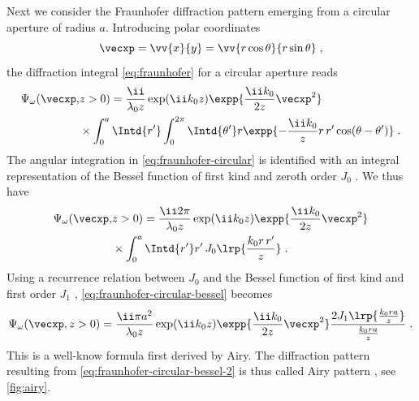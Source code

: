 \documentclass[
twoside,
openright,
titlepage,
numbers=noenddot,
headinclude,
fleqn,
a4paper,
footinclude=true,
cleardoublepage=empty,
abstractoff,
BCOR=5mm,
paper=a4,
fontsize=11pt,
british,ngerman,american,
]{scrreprt}
\begin{document}
Next we consider the Fraunhofer diffraction pattern emerging from a
circular aperture of radius $a$.  Introducing polar coordinates
\begin{equation}
  \label{eq:polar-2}
  \vecxp = \vv{x}{y} = 
  \vv{r \cos\theta}{r \sin\theta} \;,
\end{equation}
the diffraction integral \cref{eq:fraunhofer} for a circular aperture
reads
\begin{equation}
  \label{eq:fraunhofer-circular}
  \begin{split}
  \Psi_\omega(\vecxp,&z>0) =
   \frac{\ii }{\lambda_0 z}\exp(\ii k_0 z)
  \expp{\frac{\ii k_0}{2 z} \vecxp^2}
  \\ &\times\int_0^a\Intd{r'}\int_0^{2\pi}\Intd{\theta'} r 
  \expp{-\frac{\ii k_0}{z}r\,r' \cos(\theta-\theta')} \;.    
  \end{split}
\end{equation}
The angular integration in \cref{eq:fraunhofer-circular} is identified
with an integral representation of the Bessel function of first kind
and zeroth order $J_0$ \cite{BornWolf}.  We thus have
\begin{equation}
  \label{eq:fraunhofer-circular-bessel}
  \begin{split}
    \Psi_\omega(\vecxp,&z>0) =
    \frac{\ii 2 \pi}{\lambda_0 z}\exp(\ii k_0 z)
    \expp{\frac{\ii k_0}{2 z} \vecxp^2}
    \\ & \times\int_0^a\Intd{r'} r'\, J_0\lrp{\frac{k_0 r\,r'}{z}} \;.
  \end{split}
\end{equation}
Using a recurrence relation between $J_0$ and the Bessel function of
first kind and first order $J_1$ \cite{BornWolf},
\cref{eq:fraunhofer-circular-bessel} becomes
\begin{equation}
  \label{eq:fraunhofer-circular-bessel-2}
  \Psi_\omega(\vecxp,z>0) = 
  \frac{\ii\pi a^2}{\lambda_0 z}\exp(\ii k_0 z)
  \expp{\frac{\ii k_0}{2 z} \vecxp^2}
  \frac{2 J_1\lrp{\frac{k_0 r a}{z}} }{\frac{k_0 r a}{z}} \;.
\end{equation}
This is a well-know formula first derived by Airy.  The diffraction
pattern resulting from \cref{eq:fraunhofer-circular-bessel-2} is thus
called Airy pattern \cite{Airy1835}, see \cref{fig:airy}.
\end{document}
